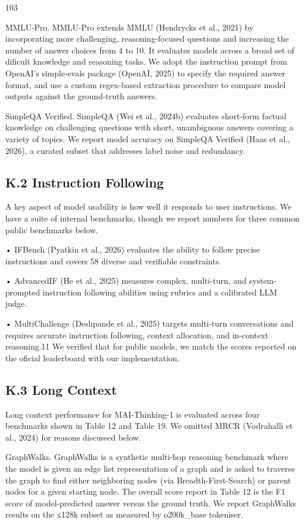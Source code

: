 \documentclass[
  10
]{article}
\begin{document}
103

MMLU‐Pro. MMLU-Pro extends MMLU (Hendrycks et al., 2021) by
incorporating more challenging, reasoning-focused questions and
increasing the number of answer choices from 4 to 10. It evaluates
models across a broad set of dificult knowledge and reasoning tasks. We
adopt the instruction prompt from OpenAI's simple-evals package (OpenAI,
2025) to specify the required answer format, and use a custom
regex-based extraction procedure to compare model outputs against the
ground-truth answers.

SimpleQA Verified. SimpleQA (Wei et al., 2024b) evaluates short-form
factual knowledge on challenging questions with short, unambiguous
answers covering a variety of topics. We report model accuracy on
SimpleQA Verified (Haas et al., 2026), a curated subset that addresses
label noise and redundancy.

\subsection{K.2 Instruction Following}\label{k.2-instruction-following}

A key aspect of model usability is how well it responds to user
instructions. We have a suite of internal benchmarks, though we report
numbers for three common public benchmarks below.

• IFBench (Pyatkin et al., 2026) evaluates the ability to follow precise
instructions and covers 58 diverse and verifiable constraints.

• AdvancedIF (He et al., 2025) measures complex, multi-turn, and
system-prompted instruction following abilities using rubrics and a
calibrated LLM judge.

• MultiChallenge (Deshpande et al., 2025) targets multi-turn
conversations and requires accurate instruction following, context
allocation, and in-context reasoning.11 We verified that for public
models, we match the scores reported on the oficial leaderboard with our
implementation.

\subsection{K.3 Long Context}\label{k.3-long-context}

Long context performance for MAI-Thinking-1 is evaluated across four
benchmarks shown in Table 12 and Table 19. We omitted MRCR (Vodrahalli
et al., 2024) for reasons discussed below.

GraphWalks. GraphWalks is a synthetic multi-hop reasoning benchmark
where the model is given an edge list representation of a graph and is
asked to traverse the graph to find either neighboring nodes (via
Breadth-First-Search) or parent nodes for a given starting node. The
overall score report in Table 12 is the F1 score of model-predicted
answer versus the ground truth. We report GraphWalks results on the
≤128k subset as measured by o200k\_base tokeniser.
\end{document}
